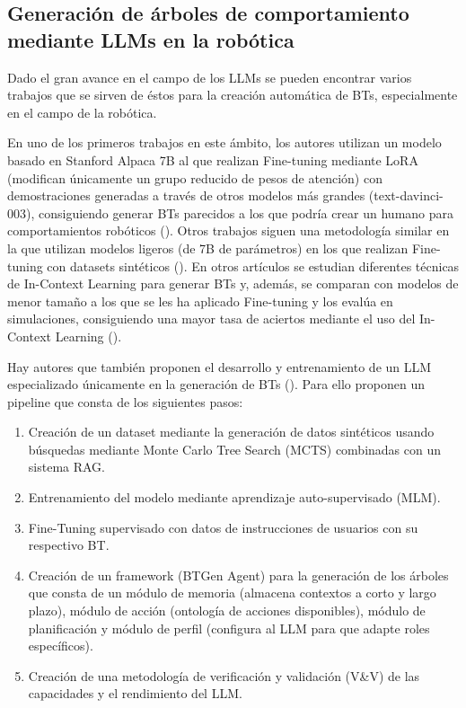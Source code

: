 \subsection{Generación de árboles de comportamiento mediante LLMs en la robótica}
Dado el gran avance en el campo de los LLMs se pueden encontrar varios trabajos que se sirven de éstos para la creación automática de BTs, especialmente en el campo de la robótica.

En uno de los primeros trabajos en este ámbito, los autores utilizan un modelo basado en Stanford Alpaca 7B al que realizan Fine-tuning mediante LoRA (modifican únicamente un grupo reducido de pesos de atención) con demostraciones generadas a través de otros modelos más grandes (text-davinci-003), consiguiendo generar BTs parecidos a los que podría crear un humano para comportamientos robóticos (\cite{llmbrain}).
Otros trabajos siguen una metodología similar en la que utilizan modelos ligeros (de 7B de parámetros) en los que realizan Fine-tuning con datasets sintéticos (\cite{BTRob2}).
En otros artículos se estudian diferentes técnicas de In-Context Learning para generar BTs y, además, se comparan con modelos de menor tamaño a los que se les ha aplicado Fine-tuning y los evalúa en simulaciones, consiguiendo una mayor tasa de aciertos mediante el uso del In-Context Learning (\cite{LLMBTPlanner}).

Hay autores que también proponen el desarrollo y entrenamiento de un LLM especializado únicamente en la generación de BTs (\cite{BTRob1}).
Para ello proponen un pipeline que consta de los siguientes pasos:

\begin{enumerate}
    \item Creación de un dataset mediante la generación de datos sintéticos usando búsquedas mediante Monte Carlo Tree Search (MCTS) combinadas con un sistema RAG.
    \item Entrenamiento del modelo mediante aprendizaje auto-supervisado (MLM).
    \item Fine-Tuning supervisado con datos de instrucciones de usuarios con su respectivo BT.
    \item Creación de un framework (BTGen Agent) para la generación de los árboles que consta de un módulo de memoria (almacena contextos a corto y largo plazo), módulo de acción (ontología de acciones disponibles), módulo de planificación y módulo de perfil (configura al LLM para que adapte roles específicos).
    \item Creación de una metodología de verificación y validación (V\&V) de las capacidades y el rendimiento del LLM.
\end{enumerate}

